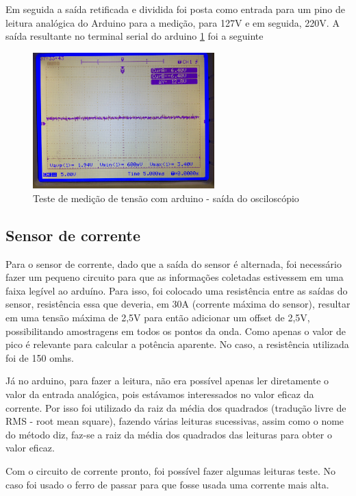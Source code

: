 Em seguida a saída retificada e dividida foi posta como entrada para um pino de leitura analógica do Arduino para a medição, para 127V e em seguida, 220V. A saída resultante no terminal serial do arduino \ref{fig:teste-medicao-tensao-osc} foi a seguinte

\begin{figure}[H]
\centering
\includegraphics[width=7cm,keepaspectratio]{figuras/teste-medicao-tensao-osc.jpg} 
\caption{\label{fig:teste-medicao-tensao-osc} Teste de medição de tensão com arduino - saída do osciloscópio}
\end{figure}

\subsection{Sensor de corrente}

Para o sensor de corrente, dado que a saída do sensor é alternada, foi necessário fazer um pequeno circuito para que as informações coletadas estivessem em uma faixa legível ao arduíno. Para isso, foi colocado uma resistência entre as saídas do sensor, resistência essa que deveria, em 30A (corrente máxima do sensor), resultar em uma tensão máxima de 2,5V para então adicionar um offset de 2,5V, possibilitando amostragens em todos os pontos da onda. Como apenas o valor de pico é relevante para calcular a potência aparente.
No caso, a resistência utilizada foi de 150 omhs. 

Já no arduino, para fazer a leitura, não era possível apenas ler diretamente o valor da entrada analógica, pois estávamos interessados no valor eficaz da corrente. Por isso foi utilizado da raiz da média dos quadrados (tradução livre de RMS - root mean square), fazendo várias leituras sucessivas, assim como o nome do método diz, faz-se a raiz da média dos quadrados das leituras para obter o valor eficaz.

Com o circuito de corrente pronto, foi possível fazer algumas leituras teste. No caso foi usado o ferro de passar para que fosse usada uma corrente mais alta. 

